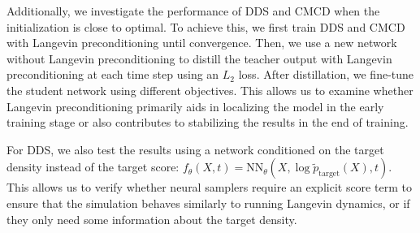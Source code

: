  Additionally, we investigate the performance of DDS and CMCD when the initialization is close to optimal.
To achieve this, we first train DDS and CMCD with Langevin preconditioning until convergence. 
Then, we use a new network without Langevin preconditioning to distill the teacher output with Langevin preconditioning at each time step using an $L_2$ loss.
After distillation, we fine-tune the student network using different objectives. 
This allows us to examine whether Langevin preconditioning primarily aids in localizing the model in the early training stage or also contributes to stabilizing the results in the end of training.

For DDS, we also test the results using a network conditioned on the target density instead of the target score: $f_\theta(X, t) = \text{NN}_{\theta}(X, \log \tilde{p}_\text{target}(X), t)$. 
This allows us to verify whether neural samplers require an explicit score term to ensure that the simulation behaves similarly to running Langevin dynamics, or if they only need some information about the target density.





